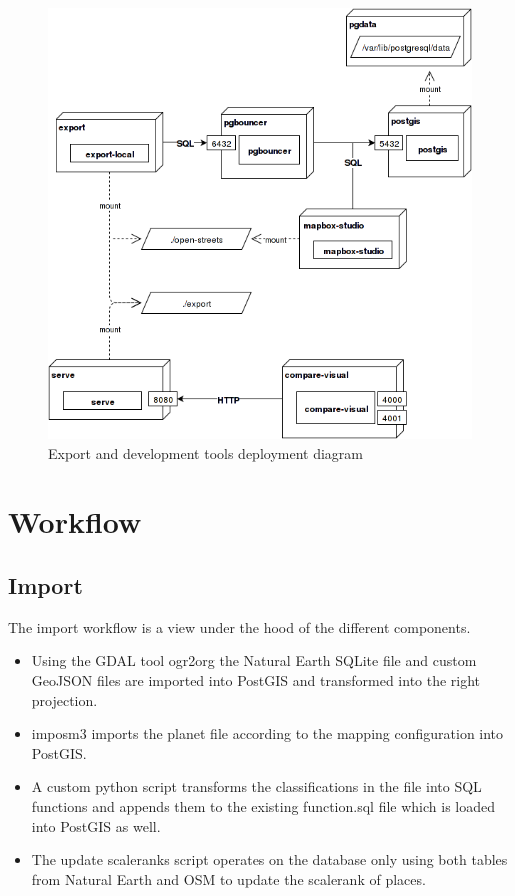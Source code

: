 \begin{figure}[H]
\centering
  \includegraphics[scale=0.6]{images/deployment_dev_export.png}
  \caption{Export and development tools deployment diagram}
\end{figure}

\newpage
\section{Workflow}\label{workflow}

\subsection{Import}\label{workflow-import}

The import workflow is a view under the hood of the different components.

\begin{itemize}
\item Using the GDAL tool ogr2org\cite{3_gdal.org_2015} the Natural Earth SQLite file and custom GeoJSON files are imported into PostGIS and transformed into the right projection.
\item imposm3\cite{4_github_2015} imports the planet file according to the mapping configuration into PostGIS.
\item A custom python script transforms the classifications in the file into SQL functions and appends them to the existing function.sql file which is loaded into PostGIS as well.
\item The update scaleranks script operates on the database only using both tables from Natural Earth and OSM to update the scalerank of places.
\end{itemize}

